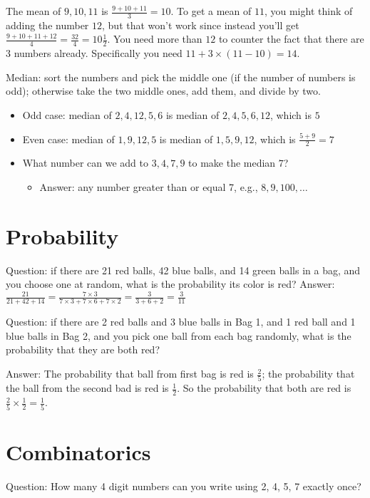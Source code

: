 \documentclass[fullpage,twocolumn]{article}
\newcommand{\vp}{{\vspace{0.1in}}}
\begin{document}
The mean of $9,10,11$ is $\frac{9+10+11}{3} = 10$. To get a mean of $11$, you might think of adding the number
$12$, but that won't work since instead you'll get $\frac{9+10+11+12}{4} = \frac{32}{4} = 10\frac{1}{2}$. You need more than $12$ to counter the fact that there are $3$ numbers
already. Specifically you need $11 + 3\times(11-10)  = 14$.

Median: sort the numbers and pick the middle one (if the number of numbers is odd);
otherwise take the two middle ones, add them, and divide by two.
\begin{itemize}
\item Odd case: median of $2,4,12,5,6$ is median of $2,4,5,6,12$, which is $5$
\item Even case: median of $1,9,12,5$ is median of $1,5,9,12$, which is $\frac{5+9}{2}=7$
\item What number can we add to $3,4,7,9$ to make the median $7$?
\begin{itemize}
\item Answer: any number greater than or equal 7, e.g., $8, 9, 100,\ldots$
\end{itemize}
\end{itemize}

\section{Probability}

Question: if there are 21 red balls, 42 blue balls, and 14 green balls
in a bag, and you choose one at random, what is
the probability its color is red?
\vp
Answer: $\frac{21}{21+42+14} = \frac{7\times3}{7\times 3 + 7 \times 6 + 7 \times 2} = \frac{3}{3+6+2} = \frac{3}{11}$


Question: if there are 2 red balls and 3 blue balls in Bag 1, and 1 red ball and 1 blue balls in Bag 2, and
you pick one ball from each bag randomly, what is the probability that they are both red?

\vp
Answer: The probability that ball from first bag is red is $\frac{2}{5}$; the probability that
the ball from the second bad is red is $\frac{1}{2}$. So the probability that both are red
is $\frac{2}{5}\times \frac{1}{2} = \frac{1}{5}$.

\section{Combinatorics}

Question: How many 4 digit numbers can you write using 2, 4, 5, 7 exactly once?
\end{document}
